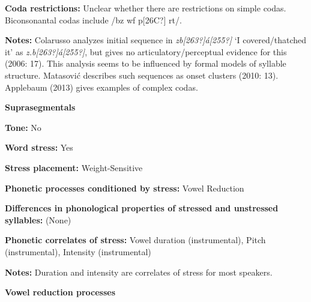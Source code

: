 \begin{styleBody}
\textbf{Coda restrictions: }Unclear whether there are restrictions on simple codas. Biconsonantal codas include /bz wf p[26C?] rt/.
\end{styleBody}

\begin{styleBody}
\textbf{Notes: }Colarusso analyzes initial sequence in \textit{zb[263?]\'{a}[255?]} ‘I covered/thatched it’ as \textit{z.b[263?]\'{a}[255?]}, but gives no articulatory/perceptual evidence for this (2006: 17). This analysis seems to be influenced by formal models of syllable structure. Matasović describes such sequences as onset clusters (2010: 13). Applebaum (2013) gives examples of complex codas.
\end{styleBody}

\begin{styleBody}
\textbf{Suprasegmentals}
\end{styleBody}

\begin{styleBody}
\textbf{Tone: }No
\end{styleBody}

\begin{styleBody}
\textbf{Word stress:} Yes
\end{styleBody}

\begin{styleBody}
\textbf{Stress placement:} Weight-Sensitive
\end{styleBody}

\begin{styleBody}
\textbf{Phonetic processes conditioned by stress:} Vowel Reduction
\end{styleBody}

\begin{styleBody}
\textbf{Differences in phonological properties of stressed and unstressed syllables:} (None)
\end{styleBody}

\begin{styleBody}
\textbf{Phonetic correlates of stress: }Vowel duration (instrumental), Pitch (instrumental), Intensity (instrumental)
\end{styleBody}

\begin{styleBody}
\textbf{Notes: }Duration and intensity are correlates of stress for most speakers.
\end{styleBody}

\begin{styleBody}
\textbf{Vowel reduction processes}
\end{styleBody}

